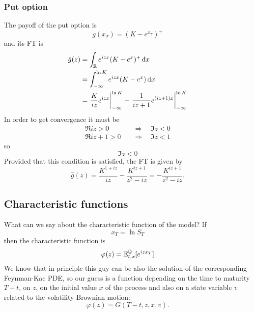 \subsubsection{Put option}
The payoff of the put option is
\begin{equation}
    g(x_T) = (K-e^{x_T})^+
\end{equation}
and its FT is
\begin{align}
    \notag\hat{g}(z) &= \int_{\mathbb{R}} e^{izx} (K-e^x)^+\,\dd x \\
    &=
    \notag \int_{-\infty}^{\ln K} e^{izx}(K-e^{x})\,\dd x \\
    &=
    \eval{\frac{K}{iz}e^{izx}}^{\ln K}_{-\infty} - \eval{\frac{1}{iz+1}e^{(iz+1)x}}_{-\infty}^{\ln K}
\end{align}
In order to get convergence it must be
\begin{align*}
    \Re{iz} > 0 &\quad\Rightarrow\quad \Im{z} < 0 \\
    \Re{iz+1} > 0 &\quad\Rightarrow\quad \Im{z} < 1
\end{align*}
so
\begin{equation}
    \Im{z} < 0
\end{equation}
Provided that this condition is satisfied, the FT is given by
\begin{equation}
    \hat{g}(z) = \frac{K^{1+iz}}{iz} - \frac{K^{iz+1}}{z^2-iz} = -\frac{K^{iz+1}}{z^2-iz}.
\end{equation}

\subsection{Characteristic functions}
What can we say about the characteristic function of the model? If
\begin{equation*}
    x_T = \ln S_T
\end{equation*}
then the characteristic function is
\begin{equation*}
    \varphi(z) = \mathbb{E}^{\mathbb{Q}}_{t,x}[e^{izx_T}]
\end{equation*}
We know that in principle this guy can be also the solution of the corresponding Feynman-Kac PDE, so our guess is a function depending on the time to maturity $T-t$, on $z$, on the initial value $x$ of the process and also on a state variable $v$ related to the volatility Brownian motion:
\begin{equation*}
    \varphi(z) = G(T-t,z,x,v).
\end{equation*}
